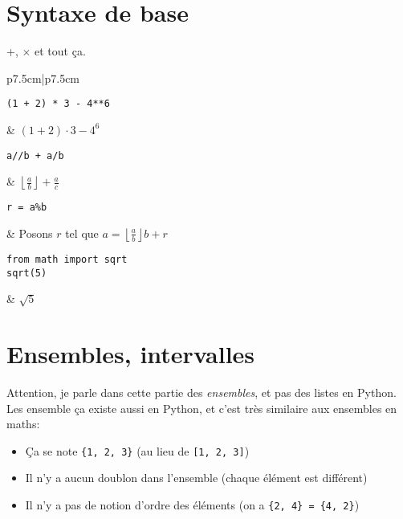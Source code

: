 \documentclass{article}
\begin{document}
\section{Syntaxe de base}
+, $\times$ et tout ça.
\begin{table}[h]
	\centering
	\begin{tabular}{p{7.5cm}|p{7.5cm}}
\begin{minipage}{0.5\linewidth}
\begin{verbatim}
(1 + 2) * 3 - 4**6
\end{verbatim}
\end{minipage}
       & $(1+2)\cdot 3 - 4^6$ \\
\begin{minipage}{0.5\linewidth}
\begin{verbatim}
a//b + a/b
\end{verbatim} 
\end{minipage} & $\displaystyle \left\lfloor \frac{a}{b} \right\rfloor + \frac{a}{c}$ \\

\begin{minipage}{0.5\linewidth}
\begin{verbatim}
r = a%b
\end{verbatim}
\end{minipage}
       & Posons $r$ tel que $a = \left\lfloor \frac{a}{b} \right\rfloor b + r$ \\
\hline
\begin{minipage}{0.5\linewidth}
\begin{verbatim}
from math import sqrt 
sqrt(5) 
\end{verbatim}
\end{minipage}
       & $ \sqrt{5}  $ \\
\end{tabular}
\end{table}

\section{Ensembles, intervalles}

Attention, je parle dans cette partie des \emph{ensembles}, et pas des listes en Python. 
Les ensemble ça existe aussi en Python, et c'est très similaire aux ensembles en maths:
\begin{itemize}
	\item Ça se note \texttt{\{1, 2, 3\}} (au lieu de \texttt{[1, 2, 3]})
	\item Il n'y a aucun doublon dans l'ensemble (chaque élément est différent)
	\item Il n'y a pas de notion d'ordre des éléments (on a \texttt{\{2, 4\} = \{4, 2\}})
\end{itemize}
\end{document}
